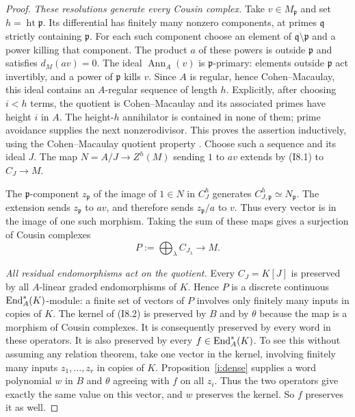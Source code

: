 \begin{proof}
\emph{These resolutions generate every Cousin complex.}
Take $v\in M_{\mathfrak p}$ and set
$h=\operatorname{ht}\mathfrak p$. Its differential has finitely
many nonzero components, at primes $\mathfrak q$ strictly containing
$\mathfrak p$. For each such component choose an element of
$\mathfrak q\setminus\mathfrak p$ and a power killing that
component. The product $a$ of these powers is outside
$\mathfrak p$ and satisfies $d_M(av)=0$.
The ideal $\operatorname{Ann}_A(v)$ is $\mathfrak p$-primary:
elements outside $\mathfrak p$ act invertibly, and a power of
$\mathfrak p$ kills $v$. Since $A$ is regular, hence
Cohen--Macaulay, this ideal contains an $A$-regular sequence of
length $h$. Explicitly, after choosing $i<h$ terms, the quotient
is Cohen--Macaulay and its associated primes have height $i$ in
$A$. The height-$h$ annihilator is contained in none of them; prime
avoidance supplies the next nonzerodivisor. This proves the assertion
inductively, using the Cohen--Macaulay quotient property
\cite[Lemma 10.104.2, tag 02JN]{StacksCMRegularSequence}.
Choose such a sequence and its ideal $J$.
The map $N=A/J\to Z^h(M)$ sending $1$ to $av$ extends by
(I8.1) to $C_J\to M$.

The $\mathfrak p$-component $z_{\mathfrak p}$ of the image of
$1\in N$ in $C_J^h$ generates
$C_{J,\mathfrak p}^h\simeq N_{\mathfrak p}$. The extension sends
$z_{\mathfrak p}$ to $av$, and therefore sends
$z_{\mathfrak p}/a$ to $v$. Thus every vector is in the image of
one such morphism. Taking the sum of these maps gives a surjection
of Cousin complexes
\[
                    P:=\bigoplus_\lambda C_{J_\lambda}
                    \longrightarrow M.                  \tag{I8.2}
\]

\emph{All residual endomorphisms act on the quotient.}
Every $C_J=K[J]$ is preserved by all $A$-linear graded
endomorphisms of $K$. Hence $P$ is a discrete continuous
$\operatorname{End}_A^*(K)$-module: a finite set of vectors of $P$ involves only
finitely many inputs in copies of $K$.
The kernel of (I8.2) is preserved by $B$ and by $\theta$ because
the map is a morphism of Cousin complexes. It is consequently
preserved by every word in these operators. It is also preserved by
every $f\in\operatorname{End}_A^*(K)$. To see this without assuming any
relation theorem, take one vector in the kernel, involving
finitely many inputs $z_1,\ldots,z_r$ in copies of $K$.
Proposition~\ref{i:dense} supplies a word polynomial $w$ in $B$
and $\theta$ agreeing with $f$ on all $z_i$. Thus the two operators
give exactly the same value on this vector, and $w$ preserves the
kernel. So $f$ preserves it as well.


\end{proof}

